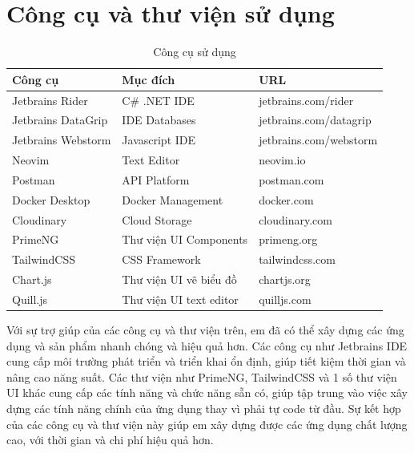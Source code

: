 \documentclass[../index.tex]{subfiles}
\begin{document}
    \section{Công cụ và thư viện sử dụng}
    \begin{table}[h]
        \centering
        \begin{tabular}{ |p{4cm}|p{5cm}|p{4.5cm}| }
            \hline
            Công cụ            & Mục đích          & URL                                \\
            \hline
            Jetbrains Rider    & C\# .NET IDE      & jetbrains.com/rider    \\
            \hline
            Jetbrains DataGrip & IDE Databases     & jetbrains.com/datagrip \\
            \hline
            Jetbrains Webstorm & Javascript IDE    & jetbrains.com/webstorm \\
            \hline
            Neovim             & Text Editor       & neovim.io                  \\
            \hline
            Postman            & API Platform      & postman.com            \\
            \hline
            Docker Desktop     & Docker Management & docker.com             \\
            \hline
            Cloudinary         & Cloud Storage     & cloudinary.com             \\
            \hline
            PrimeNG         & Thư viện UI Components     & primeng.org             \\
            \hline
            TailwindCSS         & CSS Framework     & tailwindcss.com             \\
            \hline
            Chart.js         & Thư viện UI vẽ biểu đồ     & chartjs.org             \\
            \hline
            Quill.js         & Thư viện UI text editor     & quilljs.com             \\
            \hline
        \end{tabular}
        \caption{Công cụ sử dụng}
    \end{table}
    Với sự trợ giúp của các công cụ và thư viện trên, em đã có thể xây dựng các ứng dụng và sản phẩm nhanh chóng và hiệu quả hơn. Các công cụ như Jetbrains IDE cung cấp môi trường phát triển và triển khai ổn định, giúp tiết kiệm thời gian và nâng cao năng suất. Các thư viện như PrimeNG, TailwindCSS và 1 số thư viện UI khác cung cấp các tính năng và chức năng sẵn có, giúp tập trung vào việc xây dựng các tính năng chính của ứng dụng thay vì phải tự code từ đầu. Sự kết hợp của các công cụ và thư viện này giúp em xây dựng được các ứng dụng chất lượng cao, với thời gian và chi phí hiệu quả hơn.
\end{document}
